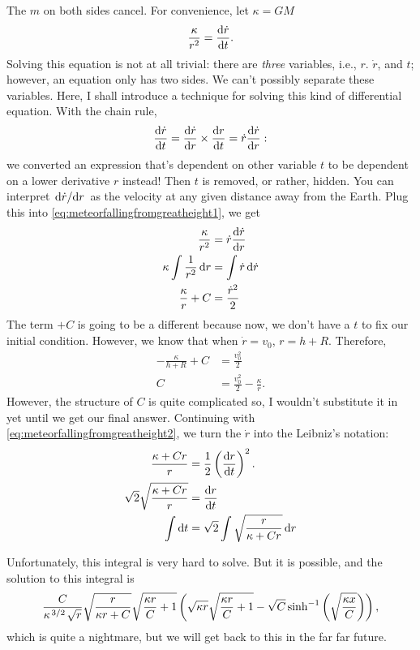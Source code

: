 The $m$ on both sides cancel. For convenience, let $\kappa = GM$
\begin{equation}
    \frac{\kappa}{r^2} = \dv{\dot{r}}{t}. \label{eq:meteorfallingfromgreatheight1}
\end{equation}
Solving this equation is not at all trivial: there are \emph{three} variables, i.e., $r$. $\dot{r}$, and $t$; however, an equation only has two sides. We can't possibly separate these variables. Here, I shall introduce a technique for solving this kind of differential equation. With the chain rule,
\begin{equation*}
    \dv{\dot{r}}{t} = \dv{\dot{r}}{r} \times \dv{r}{t} = \dot{r}\dv{\dot{r}}{r}:
\end{equation*}
we converted an expression that's dependent on other variable $t$ to be dependent on a lower derivative $r$ instead! Then $t$ is removed, or rather, hidden. You can interpret $\dv*{\dot{r}}{r}$ as the velocity at any given distance away from the Earth. Plug this into \cref{eq:meteorfallingfromgreatheight1}, we get
\begin{align}
    \frac{\kappa}{r^2} &= \dot{r}\dv{\dot{r}}{r} \nonumber\\
    \kappa\int\frac{1}{r^2}\dd{r} &= \int\dot{r}\dd{\dot{r}} \nonumber\\
    \frac{\kappa}{r} + C &= \frac{\dot{r}^2}{2} \label{eq:meteorfallingfromgreatheight2}
\end{align}
The term $+C$ is going to be a different because now, we don't have a $t$ to fix our initial condition. However, we know that when $\dot{r} = v_0$, $r = h + R$. Therefore,
\begin{align*}
    -\frac{\kappa}{h + R} + C &= \frac{v_0^2}{2} \\
    C &= \frac{v_0^2}{2} - \frac{\kappa}{r}.
\end{align*}
However, the structure of $C$ is quite complicated so, I wouldn't substitute it in yet until we get our final answer. Continuing with \cref{eq:meteorfallingfromgreatheight2}, we turn the $\dot{r}$ into the Leibniz's notation:
\begin{align*}
    \frac{\kappa + Cr}{r} &= \frac{1}{2}\left(\dv{r}{t}\right)^2. \\
    \sqrt{2}\sqrt{\frac{\kappa + Cr}{r}} &= \dv{r}{t} \\
    \int\dd{t} &= \sqrt{2}\int\sqrt{\frac{r}{\kappa + Cr}}\dd{r}
\end{align*}

Unfortunately, this integral is very hard to solve. But it is possible, and the solution to this integral is
\begin{equation*}
    \frac{C}{\kappa^{\flatfrac{3}{2}}\sqrt{r}}\sqrt{\frac{r}{\kappa r + C}}\sqrt{\frac{\kappa r}{C} + 1} \left(\sqrt{\kappa r}\sqrt{\frac{\kappa r}{C} + 1} - \sqrt{C}\sinh^{-1}\left(\sqrt{\frac{\kappa x}{C}}\right)\right),
\end{equation*}
which is quite a nightmare, but we will get back to this in the far far future.

